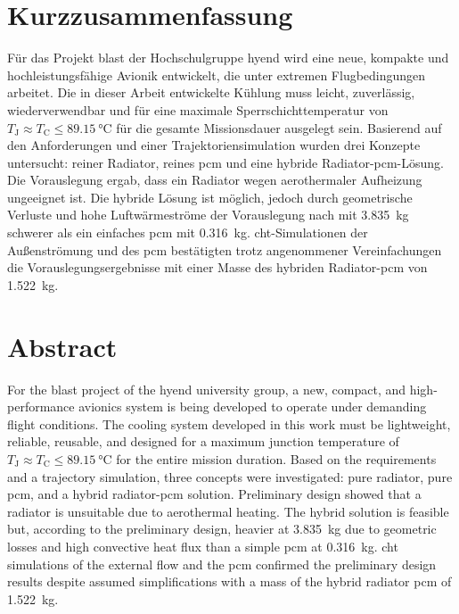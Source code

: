 \chapter*{Kurzzusammenfassung} %
\label{chap:Kurzzusammenfassung}


Für das Projekt \ac{blast} der Hochschulgruppe \ac{hyend} wird eine neue, kompakte und hochleistungsfähige Avionik entwickelt,
die unter extremen Flugbedingungen arbeitet. Die in dieser Arbeit entwickelte Kühlung muss leicht, zuverlässig, wiederverwendbar und für eine
maximale Sperrschichttemperatur von $T_\mathrm{J} \approx T_\mathrm{C} \leq \SI{89.15}{\celsius}$ für die gesamte Missionsdauer ausgelegt sein.
Basierend auf den Anforderungen und einer Trajektoriensimulation
wurden drei Konzepte untersucht: reiner Radiator, reines \ac{pcm} und eine hybride Radiator-\ac{pcm}-Lösung. Die Vorauslegung
ergab, dass ein Radiator wegen aerothermaler Aufheizung ungeeignet ist. Die hybride Lösung ist möglich, jedoch durch geometrische
Verluste und hohe Luftwärmeströme der Vorauslegung nach mit \SI{3.835}{\kilogram} schwerer als ein einfaches \ac{pcm}
mit \SI{0.316}{\kilogram}. \ac{cht}-Simulationen der Außenströmung und des \ac{pcm}
bestätigten trotz angenommener Vereinfachungen die Vorauslegungsergebnisse mit einer Masse des hybriden Radiator-\ac{pcm} von \SI{1.522}{\kilogram}.

\chapter*{Abstract} %
\label{chap:Abstract}
For the \ac{blast} project of the \ac{hyend} university group, a new, compact, and high-performance avionics system is being developed to
operate under demanding flight conditions. The cooling system developed in this work must be lightweight, reliable, reusable, and designed for a maximum
junction temperature of $T_\mathrm{J} \approx T_\mathrm{C} \leq \SI{89.15}{\celsius}$ for the entire mission duration.
Based on the requirements and a trajectory simulation, three concepts were investigated: pure radiator, pure \ac{pcm}, and a hybrid radiator-\ac{pcm}
solution. Preliminary design showed that a radiator is unsuitable due to aerothermal heating. The hybrid solution is feasible but, according to
the preliminary design, heavier at \SI{3.835}{\kilogram} due to geometric losses and high convective heat flux than a simple \ac{pcm} at
\SI{0.316}{\kilogram}. \ac{cht} simulations of the external flow and the \ac{pcm} confirmed the preliminary design results despite assumed
simplifications with a mass of the hybrid radiator \ac{pcm} of \SI{1.522}{\kilogram}.